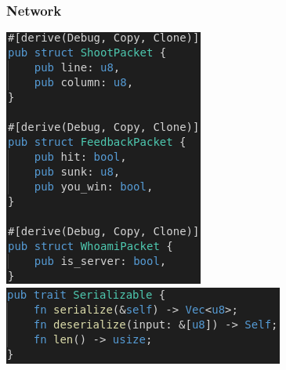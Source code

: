 \documentclass[handout]{beamer}
\begin{document}
\begin{frame}
	\frametitle{Network}
	\includegraphics[scale=0.5]{Bilder/packets.png}
	\includegraphics[scale=0.5]{Bilder/serializable.png}
\end{frame}
\end{document}
